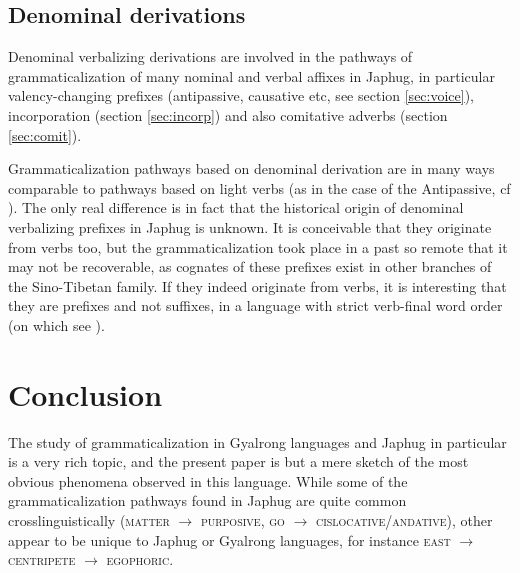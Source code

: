 \documentclass[oldfontcommands,oneside,a4paper,11pt]{article}
\begin{document}
\subsection{Denominal derivations} \label{sec:denom}
Denominal verbalizing derivations are involved in the pathways of grammaticalization of many nominal and verbal affixes in Japhug, in particular valency-changing prefixes (antipassive, causative etc, see section \ref{sec:voice}), incorporation (section \ref{sec:incorp}) and also comitative adverbs (section \ref{sec:comit}).

Grammaticalization pathways based on denominal derivation are in many ways comparable to pathways  based on light verbs (as in the case of the Antipassive, cf \citealt{creissels12antip}). The only real  difference is in fact that the historical origin of denominal verbalizing prefixes in Japhug is unknown. It is conceivable that they originate from verbs too, but the grammaticalization took place in a past so remote that it may not be recoverable, as cognates of these prefixes exist in other branches of the Sino-Tibetan family. If they indeed originate from verbs, it is interesting that they are prefixes and not suffixes, in a language with strict verb-final word order (on which see \citealt{jacques13harmonization}).  
 

\section{Conclusion} 
The study of grammaticalization in Gyalrong languages and Japhug in particular is a very rich topic, and the present paper is but a mere sketch of the most obvious phenomena observed in this language. While some of the grammaticalization pathways found in Japhug are quite common crosslinguistically (\textsc{matter} $\rightarrow$ \textsc{purposive}, \textsc{go} $\rightarrow$ \textsc{cislocative/andative}), other appear to be unique to Japhug or Gyalrong languages, for instance \textsc{east} $\rightarrow$ \textsc{centripete} $\rightarrow$ \textsc{egophoric}.




\end{document}
